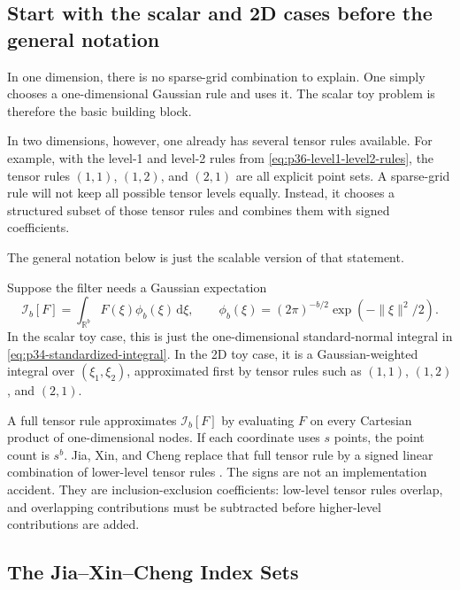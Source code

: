 \documentclass[11pt]{article}
\numberwithin{equation}{section}
\newcommand{\R}{\mathbb R}
\newcommand{\dd}{\,\mathrm d}
\begin{document}
\subsection{Start with the scalar and 2D cases before the general notation}

In one dimension, there is no sparse-grid combination to explain.  One simply
chooses a one-dimensional Gaussian rule and uses it.  The scalar toy problem is
therefore the basic building block.

In two dimensions, however, one already has several tensor rules available.  For
example, with the level-1 and level-2 rules from
\eqref{eq:p36-level1-level2-rules}, the tensor rules \((1,1)\), \((1,2)\), and
\((2,1)\) are all explicit point sets.  A sparse-grid rule will not keep all
possible tensor levels equally.  Instead, it chooses a structured subset of
those tensor rules and combines them with signed coefficients.

The general notation below is just the scalable version of that statement.

Suppose the filter needs a Gaussian expectation
\begin{equation}
  \mathcal I_b[F]
  =
  \int_{\R^b}F(\xi)\phi_b(\xi)\dd\xi,
  \qquad
  \phi_b(\xi)=(2\pi)^{-b/2}\exp(-\|\xi\|^2/2).
  \label{eq:p32-gaussian-integral-target}
\end{equation}
In the scalar toy case, this is just the one-dimensional standard-normal integral
in \eqref{eq:p34-standardized-integral}.  In the 2D toy case, it is a
Gaussian-weighted integral over \((\xi_1,\xi_2)\), approximated first by tensor
rules such as \((1,1)\), \((1,2)\), and \((2,1)\).

A full tensor rule approximates \(\mathcal I_b[F]\) by evaluating \(F\) on
every Cartesian product of one-dimensional nodes.  If each coordinate uses
\(s\) points, the point count is \(s^b\).  Jia, Xin, and Cheng replace that
full tensor rule by a signed linear combination of lower-level tensor rules
\cite[Section 3.1]{jia2012sparsegrid}.  The signs are not an implementation
accident.  They are inclusion-exclusion coefficients: low-level tensor rules
overlap, and overlapping contributions must be subtracted before higher-level
contributions are added.

\subsection{The Jia--Xin--Cheng Index Sets}
\label{subsec:p32-source-index-sets}
\end{document}
